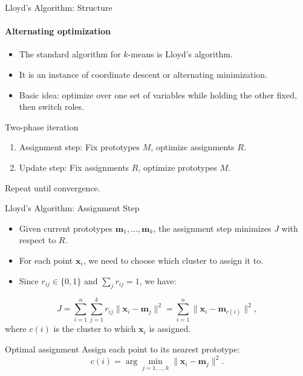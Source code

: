 \begin{frame}{Lloyd's Algorithm: Structure}
  \framesubtitle{Alternating optimization}
  \begin{itemize}
    \item The standard algorithm for $k$-means is \alert{Lloyd's algorithm}.
    \item It is an instance of \alert{coordinate descent} or \alert{alternating minimization}.
    \item Basic idea: optimize over one set of variables while holding the other fixed,
          then switch roles.
  \end{itemize}
  \begin{block}{Two-phase iteration}
    \begin{enumerate}
      \item \alert{Assignment step}: Fix prototypes $M$, optimize assignments $R$.
      \item \alert{Update step}: Fix assignments $R$, optimize prototypes $M$.
    \end{enumerate}
    Repeat until convergence.
  \end{block}
\end{frame}

\begin{frame}{Lloyd's Algorithm: Assignment Step}
  \begin{itemize}
    \item Given current prototypes $\mathbf{m}_1,\ldots,\mathbf{m}_k$, the assignment
          step minimizes $J$ with respect to $R$.
    \item For each point $\mathbf{x}_i$, we need to choose which cluster to assign it to.
    \item Since $r_{ij}\in\{0,1\}$ and $\sum_j r_{ij}=1$, we have:
  \end{itemize}
  \[
  J = \sum_{i=1}^{n} \sum_{j=1}^{k} r_{ij}\|\mathbf{x}_i-\mathbf{m}_j\|^2
    = \sum_{i=1}^{n} \|\mathbf{x}_i-\mathbf{m}_{c(i)}\|^2,
  \]
  where $c(i)$ is the cluster to which $\mathbf{x}_i$ is assigned.
  \begin{block}{Optimal assignment}
    Assign each point to its \alert{nearest prototype}:
    \[
    c(i) = \arg\min_{j=1,\ldots,k} \|\mathbf{x}_i-\mathbf{m}_j\|^2.
    \]
  \end{block}
\end{frame}

